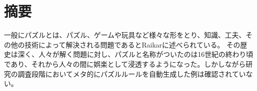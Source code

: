 \chapter*{摘要}
\label{chap:abstract}

一般にパズルとは、パズル、ゲームや玩具など様々な形をとり、知識、工夫、その他の技術によって解決される問題であるとRaikar\cite{Raikar2022}に述べられている。
その歴史は深く、人々が解く問題に対し、パズルと名称がついたのは16世紀の終わり頃であり、それから人々の間に娯楽として浸透するようになった。しかしながら研究の調査段階においてメタ的にパズルルールを自動生成した例は確認されていない。
